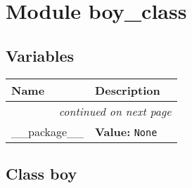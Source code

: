 %
%
%


\section{Module boy\_class}

    \label{boy_class}


  \subsection{Variables}

    \vspace{-1cm}
\hspace{\varindent}\begin{longtable}{|p{\varnamewidth}|p{\vardescrwidth}|l}
\cline{1-2}
\cline{1-2} \centering \textbf{Name} & \centering \textbf{Description}& \\
\cline{1-2}
\endhead\cline{1-2}\multicolumn{3}{r}{\small\textit{continued on next page}}\\\endfoot\cline{1-2}
\endlastfoot\raggedright \_\-\_\-p\-a\-c\-k\-a\-g\-e\-\_\-\_\- & \raggedright \textbf{Value:} 
{\tt None}&\\
\cline{1-2}
\end{longtable}



\subsection{Class boy}

    \label{boy_class:boy}

